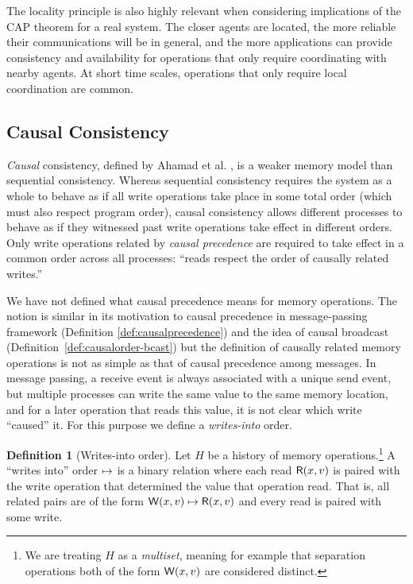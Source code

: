 \documentclass[]             %
{NASA}                       %
\theoremstyle{definition}
\newtheorem{definition}[theorem]{Definition}
\begin{document}
The locality principle is also highly relevant when considering
implications of the CAP theorem for a real system. The closer agents
are located, the more reliable their communications will be in
general, and the more applications can provide consistency and
availability for operations that only require coordinating with nearby
agents. At short time scales, operations that only require local
coordination are common.

\subsection{Causal Consistency}
\label{ssec:causal-memory}
\emph{Causal} consistency, defined by Ahamad et
al. \cite{1995:causal-memory}, is a weaker memory model than
sequential consistency. Whereas sequential consistency requires the
system as a whole to behave as if all write operations take place in
some total order (which must also respect program order), causal
consistency allows different processes to behave as if they witnessed
past write operations take effect in different orders. Only write
operations related by \emph{causal precedence} are required to take
effect in a common order across all processes: ``reads respect the
order of causally related writes.''  \cite{1995:causal-memory}

We have not defined what causal precedence means for memory
operations. The notion is similar in its motivation to causal
precedence in message-passing framework (Definition
\ref{def:causalprecedence}) and the idea of causal broadcast
(Definition~\ref{def:causalorder-bcast}) but the definition of
causally related memory operations is not as simple as that of causal
precedence among messages. In message passing, a receive event is
always associated with a unique send event, but multiple processes can
write the same value to the same memory location, and for a later
operation that reads this value, it is not clear which write
``caused'' it. For this purpose we define a \emph{writes-into} order.

\begin{definition}[Writes-into order]
  Let $H$ be a history of memory operations.\footnote{We are treating
    $H$ as a \emph{multiset}, meaning for example that separation
    operations both of the form $\mathsf{W}\!\left(x, v\right)$ are considered
    distinct.} A ``writes into'' order $\mapsto$ is a binary
  relation where each read $\mathsf{R}\!\left(x, v\right)$ is paired with the
  write operation that determined the value that operation read. That
  is, all related pairs are of the form
  $\mathsf{W}\!\left(x, v\right) \mapsto \mathsf{R}\!\left(x, v\right)$ and every read is
  paired with some write.
\end{definition}
\end{document}
